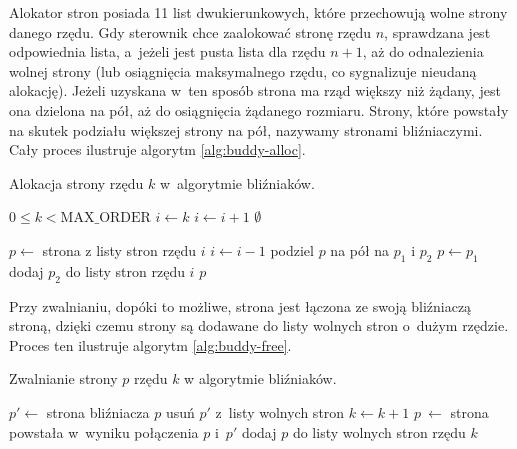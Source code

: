 Alokator stron posiada 11 list dwukierunkowych, które przechowują
wolne strony danego rzędu.  Gdy sterownik chce zaalokować stronę rzędu
$n$, sprawdzana jest odpowiednia lista, a~jeżeli jest pusta lista dla
rzędu $n+1$, aż do odnalezienia wolnej strony (lub osiągnięcia
maksymalnego rzędu, co sygnalizuje nieudaną alokację).  Jeżeli
uzyskana w~ten sposób strona ma rząd większy niż żądany, jest ona
dzielona na pół, aż do osiągnięcia żądanego rozmiaru.  Strony, które
powstały na skutek podziału większej strony na pół, nazywamy stronami
bliźniaczymi.  Cały proces ilustruje algorytm \ref{alg:buddy-alloc}.

\begin{algorithm}[p]
\caption[Alokacja strony w~algorytmie bliźniaków.]{Alokacja strony
  rzędu $k$ w~algorytmie bliźniaków.}
\label{alg:buddy-alloc}
\begin{algorithmic}[1]
\Require $0 \leq k < \mathrm{MAX\_ORDER}$
    \State $i \gets k$
        \State $i \gets i + 1$
            \State \Return $\emptyset$
        \EndIf
    \EndWhile

    \State $p \gets$ strona z listy stron rzędu $i$
        \State $i \gets i - 1$
        \State podziel $p$ na pół na $p_1$ i $p_2$
        \State $p \gets p_1$
        \State dodaj $p_2$ do listy stron rzędu $i$
    \EndWhile
    \State \Return $p$
\EndFunction
\end{algorithmic}
\end{algorithm}

Przy zwalnianiu, dopóki to możliwe, strona jest łączona ze swoją
bliźniaczą stroną, dzięki czemu strony są dodawane do listy wolnych
stron o~dużym rzędzie.  Proces ten ilustruje algorytm
\ref{alg:buddy-free}.

\begin{algorithm}[p]
\caption[Zwalnianie strony w~algorytmie bliźniaków.]{Zwalnianie strony
  $p$ rzędu $k$ w algorytmie bliźniaków.}
\label{alg:buddy-free}
\begin{algorithmic}[1]
        \State $p' \gets$ strona bliźniacza $p$
        \State usuń $p'$ z~listy wolnych stron
        \State $k \gets k + 1$
        \State $p~\gets$ strona powstała w~wyniku połączenia $p$ i~$p'$ \label{alg:buddy-free:join}
    \EndWhile
    \State dodaj $p$ do listy wolnych stron rzędu $k$ \label{alg:buddy-free:add}
\EndProcedure
\end{algorithmic}
\end{algorithm}

